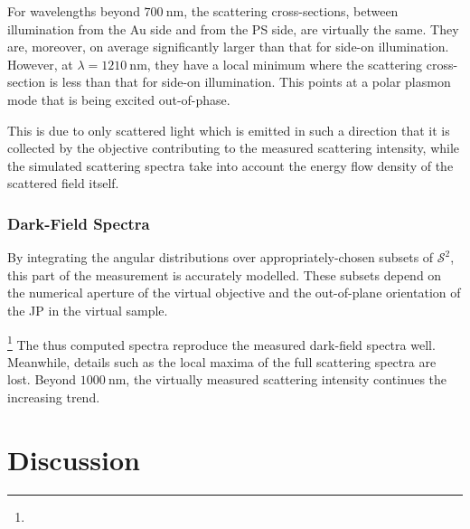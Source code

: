 \documentclass[10pt]{article}
\begin{document}
For wavelengths beyond $\SI{700}{\nano\meter}$, the scattering cross-sections, between illumination from the Au side and from the PS side, are virtually the same. 
They are, moreover, on average significantly larger than that for side-on illumination. 
However, at $\lambda=\SI{1210}{\nano\meter}$, they have a local minimum where the scattering cross-section is less than that for side-on illumination. 
This points at a polar plasmon mode that is being excited out-of-phase. 

This is due to only scattered light which is emitted in such a direction that it is collected by the objective contributing to the measured scattering intensity, while the simulated scattering spectra take into account the energy flow density of the scattered field itself. 


\subsubsection*{Dark-Field Spectra}

By integrating the angular distributions over appropriately-chosen subsets of $\mathcal{S}^2$, this part of the measurement is accurately modelled. 
These subsets depend on the numerical aperture of the virtual objective and the out-of-plane orientation of the JP in the virtual sample. 

\footnote{} 
The thus computed spectra reproduce the measured dark-field spectra well. 
Meanwhile, details such as the local maxima of the full scattering spectra are lost. 
Beyond $\SI{1000}{\nano\meter}$, the virtually measured scattering intensity continues the increasing trend.  







\section*{Discussion}
\end{document}
